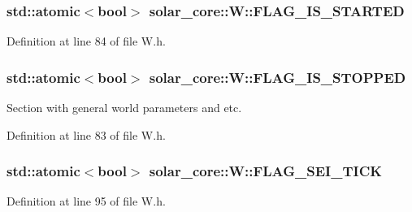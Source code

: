 \subsubsection[{F\+L\+A\+G\+\_\+\+I\+S\+\_\+\+S\+T\+A\+R\+T\+E\+D}]{\setlength{\rightskip}{0pt plus 5cm}std\+::atomic$<$bool$>$ solar\+\_\+core\+::\+W\+::\+F\+L\+A\+G\+\_\+\+I\+S\+\_\+\+S\+T\+A\+R\+T\+E\+D}\label{classsolar__core_1_1_w_a8456f88d45f2e8bf67eccd7f0c8d08fa}


Definition at line 84 of file W.\+h.

\hypertarget{classsolar__core_1_1_w_a9bb998c65a7427961de179f41e25daea}{}
\subsubsection[{F\+L\+A\+G\+\_\+\+I\+S\+\_\+\+S\+T\+O\+P\+P\+E\+D}]{\setlength{\rightskip}{0pt plus 5cm}std\+::atomic$<$bool$>$ solar\+\_\+core\+::\+W\+::\+F\+L\+A\+G\+\_\+\+I\+S\+\_\+\+S\+T\+O\+P\+P\+E\+D}\label{classsolar__core_1_1_w_a9bb998c65a7427961de179f41e25daea}
Section with general world parameters and etc. 

Definition at line 83 of file W.\+h.

\hypertarget{classsolar__core_1_1_w_a65d2047e574ed6201a8e21ec1ba1bec4}{}
\subsubsection[{F\+L\+A\+G\+\_\+\+S\+E\+I\+\_\+\+T\+I\+C\+K}]{\setlength{\rightskip}{0pt plus 5cm}std\+::atomic$<$bool$>$ solar\+\_\+core\+::\+W\+::\+F\+L\+A\+G\+\_\+\+S\+E\+I\+\_\+\+T\+I\+C\+K}\label{classsolar__core_1_1_w_a65d2047e574ed6201a8e21ec1ba1bec4}


Definition at line 95 of file W.\+h.

\hypertarget{classsolar__core_1_1_w_ae383b7a595cb28d52aa747fc7e5bb619}{}
